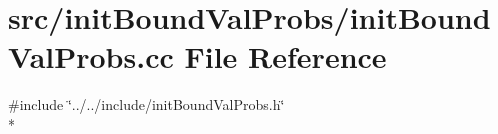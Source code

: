\section{src/init\-Bound\-Val\-Probs/init\-Bound\-Val\-Probs.cc File Reference}
\label{init_bound_val_probs_8cc}
{\ttfamily \#include \char`\"{}../../include/init\-Bound\-Val\-Probs.\-h\char`\"{}}\\*
